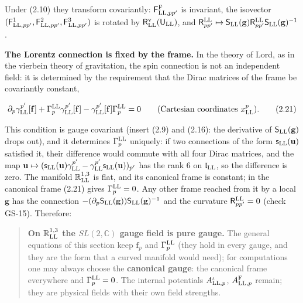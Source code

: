 \documentclass[
  10pt,
]{article}
\begin{document}
Under (2.10) they transform covariantly:
\(\mathsf F^{\rm F}_{{\rm LL},pp'}\) is invariant, the isovector
\((\mathsf F^1_{{\rm LL},pp'},\mathsf F^2_{{\rm LL},pp'},\mathsf F^3_{{\rm LL},pp'})\)
is rotated by \(\mathsf R^{\rm v}_{\rm LL}(\mathsf U_{\rm LL})\), and
\(\mathsf R^{\rm LL}_{pp'}\mapsto\mathsf S_{\rm LL}(\mathbf g)\mathsf R^{\rm LL}_{pp'}\mathsf S_{\rm LL}(\mathbf g)^{-1}\).

\textbf{The Lorentz connection is fixed by the frame.} In the theory of
Lord, as in the vierbein theory of gravitation, the spin connection is
not an independent field: it is determined by the requirement that the
Dirac matrices of the frame be covariantly constant,

\[\partial_p\gamma^{p'}_{\rm LL}[\mathbf f]+\Gamma^{\rm LL}_p\gamma^{p'}_{\rm LL}[\mathbf f]-\gamma^{p'}_{\rm LL}[\mathbf f]\Gamma^{\rm LL}_p=0\qquad\text{(Cartesian coordinates } x^p_{\rm LL}).\tag{2.21}\]

This condition is gauge covariant (insert (2.9) and (2.16): the
derivative of \(\mathsf S_{\rm LL}(\mathbf g)\) drops out), and it
determines \(\Gamma^{\rm LL}_p\) uniquely: if two connections of the
form \(\mathsf s_{\rm LL}(\mathbf u)\) satisfied it, their difference
would commute with all four Dirac matrices, and the map
\(\mathbf u\mapsto(\mathsf s_{\rm LL}(\mathbf u)\gamma^{p'}_{\rm LL}-\gamma^{p'}_{\rm LL}\mathsf s_{\rm LL}(\mathbf u))_{p'}\)
has the rank 6 on \(\mathfrak l_{\rm LL}\), so the difference is zero.
The manifold \(\mathbb R^{1,3}_{\rm LL}\) is flat, and its canonical
frame is constant; in the canonical frame (2.21) gives
\(\Gamma^{\rm LL}_p=0\). Any other frame reached from it by a local
\(\mathbf g\) has the connection
\(-(\partial_p\mathsf S_{\rm LL}(\mathbf g))\mathsf S_{\rm LL}(\mathbf g)^{-1}\)
and the curvature \(\mathsf R^{\rm LL}_{pp'}=0\) (check GS-15).
Therefore:

\begin{quote}
\textbf{On \(\mathbb R^{1,3}_{\rm LL}\) the \(SL(2,\mathbb C)\) gauge
field is pure gauge.} The general equations of this section keep
\(\mathbf f_p\) and \(\Gamma^{\rm LL}_p\) (they hold in every gauge, and
they are the form that a curved manifold would need); for computations
one may always choose the \textbf{canonical gauge}: the canonical frame
everywhere and \(\Gamma^{\rm LL}_p=0\). The internal potentials
\(A^\iota_{{\rm LL},p}\), \(A^{\rm F}_{{\rm LL},p}\) remain; they are
physical fields with their own field strengths.
\end{quote}
\end{document}
